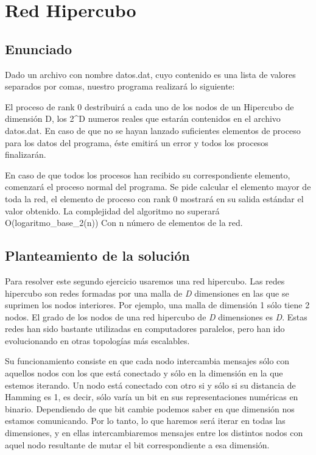 \documentclass[11pt]{article}
\begin{document}
\section{Red Hipercubo}
\subsection{Enunciado}
Dado un archivo con nombre datos.dat, cuyo contenido es una lista de valores separados por comas, nuestro programa realizará lo siguiente:

El proceso de rank 0 destribuirá a cada uno de los nodos de un Hipercubo de dimensión D, los 2\^{}D numeros reales que estarán contenidos en el archivo datos.dat. En caso de que no se hayan lanzado suficientes elementos de proceso para los datos del programa, éste emitirá un error y todos los procesos finalizarán.

En caso de que todos los procesos han recibido su correspondiente elemento, comenzará el proceso normal del programa. Se pide calcular el elemento mayor de toda la red, el elemento de proceso con rank 0 mostrará en su salida estándar el valor obtenido. La complejidad del algoritmo no superará O(logaritmo\_base\_2(n)) Con n número de elementos de la red.


\subsection{Planteamiento de la solución}
Para resolver este segundo ejercicio usaremos una red hipercubo. Las redes hipercubo son redes formadas por una malla de \emph{D} dimensiones en las que se suprimen los nodos interiores. Por ejemplo, una malla de dimensión 1 sólo tiene 2 nodos. El grado de los nodos de una red hipercubo de \emph{D} dimensiones es \emph{D}. Estas redes han sido bastante utilizadas en computadores paralelos, pero han ido evolucionando en otras topologías más escalables.

Su funcionamiento consiste en que cada nodo intercambia mensajes sólo con aquellos nodos con los que está conectado y sólo en la dimensión en la que estemos iterando. Un nodo está conectado con otro si y sólo si su distancia de Hamming es 1, es decir, sólo varía un bit en sus representaciones numéricas en binario. Dependiendo de que bit cambie podemos saber en que dimensión nos estamos comunicando. Por lo tanto, lo que haremos será iterar en todas las dimensiones, y en ellas intercambiaremos mensajes entre los distintos nodos con aquel nodo resultante de mutar el bit correspondiente a esa dimensión.
\end{document}
